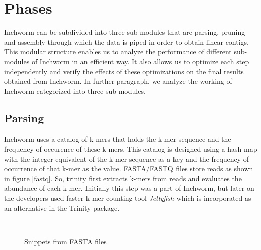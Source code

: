\label{key}\documentclass[bachinf, english ,zihtitle,final,hyperref,utf8]{zihpub}
\begin{document}
\section{Phases}
Inchworm can be subdivided into three sub-modules that  are parsing, pruning and assembly through which the data is piped in order to obtain linear contigs. This modular structure enables us to analyze the performance of different sub-modules of Inchworm in an efficient way. It also allows us to optimize each step independently and verify the effects of these optimizations on the final results obtained from Inchworm. In further paragraph, we analyze the working of Inchworm categorized into three sub-modules.  
\subsection{Parsing}
Inchworm uses a catalog of k-mers that holds the k-mer sequence and the frequency of occurence of these k-mers. This catalog is designed using a hash map with the integer equivalent of the k-mer sequence as a key and the frequency of occurrence of that k-mer as the value. FASTA/FASTQ files store reads as shown in figure \ref{fastq}. So, trinity first extracts k-mers  from reads and evaluates the abundance of each k-mer. Initially this step was a part of Inchworm, but  later on the developers used faster k-mer counting tool  \emph{Jellyfish} which is incorporated as an alternative in the Trinity package.
\begin{figure}[h]
\begin{center}
\\
\caption{Snippets from FASTA files}
\end{center}
\end{figure}
\end{document}
